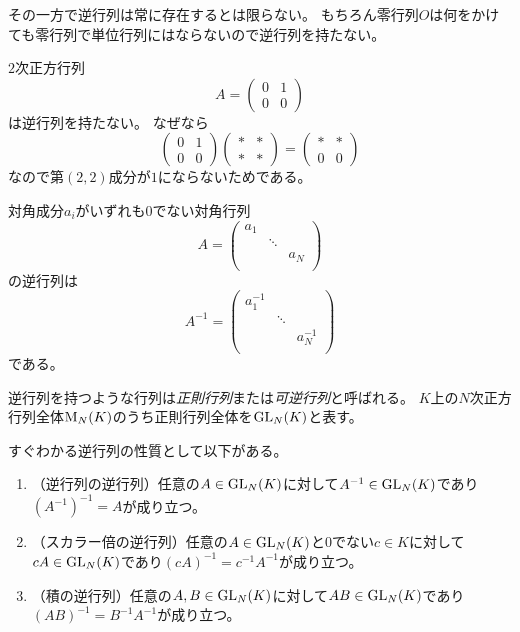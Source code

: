 その一方で逆行列は常に存在するとは限らない。
もちろん零行列$O$は何をかけても零行列で単位行列にはならないので逆行列を持たない。

\begin{example}
$2$次正方行列
$$
A = \begin{pmatrix}0 & 1 \\ 0 & 0\end{pmatrix}
$$
は逆行列を持たない。
なぜなら
$$
\begin{pmatrix}0 & 1 \\ 0 & 0\end{pmatrix}\begin{pmatrix}* & * \\ * & *\end{pmatrix}
= \begin{pmatrix}* & * \\ 0 & 0\end{pmatrix}
$$
なので第$(2, 2)$成分が$1$にならないためである。
\end{example}

\begin{example}
対角成分$a_i$がいずれも$0$でない対角行列
$$
A =
\begin{pmatrix}
a_1 &        &    \\
    & \ddots &    \\
    &        & a_N\\
\end{pmatrix}
$$
の逆行列は
$$
A^{-1} =
\begin{pmatrix}
a_1^{-1} &        &    \\
    & \ddots &    \\
    &        & a_N^{-1}\\
\end{pmatrix}
$$
である。
\end{example}

逆行列を持つような行列は\emph{正則行列}または\emph{可逆行列}と呼ばれる。
$K$上の$N$次正方行列全体$\mathrm{M}_N(K)$のうち正則行列全体を$\mathrm{GL}_N(K)$と表す。

すぐわかる逆行列の性質として以下がある。

\begin{enumerate}
\item
（逆行列の逆行列）任意の$A \in \mathrm{GL}_N(K)$に対して$A^{-1} \in \mathrm{GL}_N(K)$であり$(A^{-1})^{-1} = A$が成り立つ。
\item
（スカラー倍の逆行列）任意の$A \in \mathrm{GL}_N(K)$と$0$でない$c \in K$に対して$c A \in \mathrm{GL}_N(K)$であり$(c A)^{-1} = c^{-1} A^{-1}$が成り立つ。
\item
（積の逆行列）任意の$A, B \in \mathrm{GL}_N(K)$に対して$A B \in \mathrm{GL}_N(K)$であり$(A B)^{-1} = B^{-1} A^{-1}$が成り立つ。
\end{enumerate}

